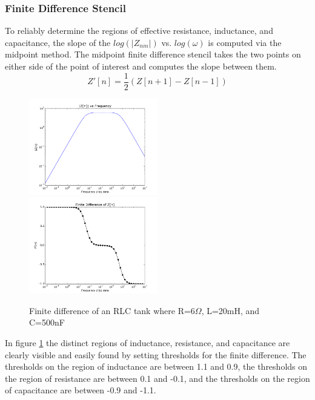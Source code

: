 \documentclass[11pt,twoside]{mitthesis}
\begin{document}
\subsubsection{Finite Difference Stencil}
To reliably determine the regions of effective resistance, inductance, and capacitance, the slope of the $log{(|Z_{nm}|)}$ vs. $log{(\omega)}$ is computed via the midpoint method.
The midpoint finite difference stencil takes the two points on either side of the point of interest and computes the slope between them.\\
\begin{equation*}
Z'[n]=\frac{1}{2}(Z[n+1]-Z[n-1])
\end{equation*}
\begin{figure}[H]
\includegraphics[width=0.5\textwidth]{../fd4.png}
\includegraphics[width=0.5\textwidth]{../fd3.png}
\caption{Finite difference of an RLC tank where R=6$\Omega$, L=20mH, and C=500nF}
\label{fig:fd}
\end{figure}

In figure \ref{fig:fd} the distinct regions of inductance, resistance, and capacitance are clearly visible and easily found by setting thresholds for the finite difference.
The thresholds on the region of inductance are between 1.1 and 0.9, the thresholds on the region of resistance are between 0.1 and -0.1, and the thresholds on the region of capacitance are between -0.9 and -1.1.
\end{document}
